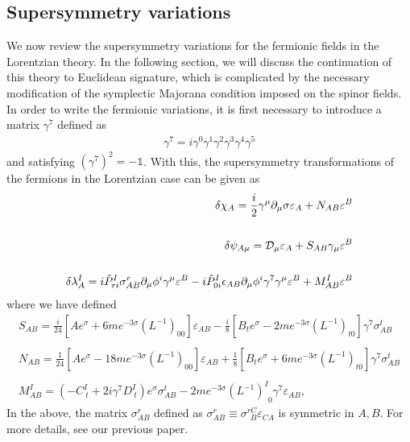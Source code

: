 \documentclass[12pt]{article}
\begin{document}
\subsection{Supersymmetry variations}
We now review the supersymmetry variations for the fermionic fields in the Lorentzian theory. In the following section, we will discuss the continuation of this theory to Euclidean signature, which is complicated by the necessary modification of the symplectic Majorana condition imposed on the spinor fields.
In order to write the fermionic variations, it is first necessary to introduce a matrix $\gamma^7$ defined as 
\begin{eqnarray}
\gamma^7=i\gamma^0\gamma^1\gamma^2\gamma^3\gamma^4\gamma^5
\end{eqnarray}
and satisfying $(\gamma^7)^2=-\mathds{1}$. With this, the supersymmetry transformations of the fermions in the Lorentzian case can be given as
\begin{eqnarray}
\delta \chi_A = {i \over 2} \gamma^\mu \partial_\mu \sigma \varepsilon_A + N_{AB} \varepsilon^B 
\nonumber\\\nonumber\\
\delta \psi_{A \mu} = {\cal D}_\mu \varepsilon_A + S_{AB} \gamma_\mu \varepsilon^B
\nonumber\\\nonumber\\
\delta \lambda^I_A = i \hat P^I_{r i} \sigma^r_{AB} \partial_\mu \phi^i \gamma^\mu \varepsilon^B -i \hat P^I_{0 i} \epsilon_{AB} \partial_\mu \phi^i \gamma^7 \gamma^\mu \varepsilon^B + M^I_{AB} \varepsilon^B
\end{eqnarray}
where we have defined
\begin{eqnarray}
S_{AB}=\!\frac{i}{24}[Ae^{\sigma}\! +\!
6me^{-3\sigma}(L^{-1})_{00}]\varepsilon_{AB}\! -\!
\frac{i}{8}[B_te^{\sigma}-2me^{-3\sigma}(L^{-1})_{t0}]\gamma^7\sigma^t_{AB}\nonumber
\\\nonumber\\
N_{AB}=\!\frac{1}{24}[Ae^{\sigma}\! -\!
18me^{-3\sigma}(L^{-1})_{00}]\varepsilon_{AB}\! +\!
\frac{1}{8}[B_te^{\sigma}\! +\! 6me^{-3\sigma}(L^{-1})_{t0}]\gamma^7\sigma^t_{AB}\nonumber\\
\nonumber\\
M^I_{AB}=\!(-C^I_{~t}+2i\gamma^7D^I_{~t})e^{\sigma}\sigma^t_{AB}-
2me^{-3\sigma}(L^{-1})^I_{\ \ 0}\gamma^7\varepsilon_{AB}, 
\end{eqnarray}
In the above, the matrix $\sigma^r_{AB}$ defined as $\sigma^r_{AB}\equiv\sigma^{rC}_{~~B}\varepsilon_{CA}$ is symmetric in $A,B$. For more details, see our previous paper.
\end{document}
